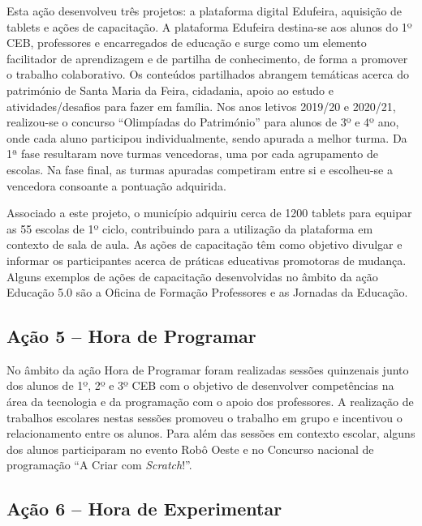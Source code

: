 \documentclass[
]{book}
\begin{document}
Esta ação desenvolveu três projetos: a plataforma digital Edufeira, aquisição de tablets e ações de capacitação. A plataforma Edufeira destina-se aos alunos do 1º CEB, professores e encarregados de educação e surge como um elemento facilitador de aprendizagem e de partilha de conhecimento, de forma a promover o trabalho colaborativo. Os conteúdos partilhados abrangem temáticas acerca do património de Santa Maria da Feira, cidadania, apoio ao estudo e atividades/desafios para fazer em família. Nos anos letivos 2019/20 e 2020/21, realizou-se o concurso ``Olimpíadas do Património'' para alunos de 3º e 4º ano, onde cada aluno participou individualmente, sendo apurada a melhor turma. Da 1ª fase resultaram nove turmas vencedoras, uma por cada agrupamento de escolas. Na fase final, as turmas apuradas competiram entre si e escolheu-se a vencedora consoante a pontuação adquirida.

Associado a este projeto, o município adquiriu cerca de 1200 tablets para equipar as 55 escolas de 1º ciclo, contribuindo para a utilização da plataforma em contexto de sala de aula. As ações de capacitação têm como objetivo divulgar e informar os participantes acerca de práticas educativas promotoras de mudança. Alguns exemplos de ações de capacitação desenvolvidas no âmbito da ação Educação 5.0 são a Oficina de Formação Professores e as Jornadas da Educação.

\hypertarget{auxe7uxe3o-5-hora-de-programar}{%
\subsection{\texorpdfstring{\textbf{Ação 5 -- Hora de Programar}}{Ação 5 -- Hora de Programar}}\label{auxe7uxe3o-5-hora-de-programar}}

No âmbito da ação Hora de Programar foram realizadas sessões quinzenais junto dos alunos de 1º, 2º e 3º CEB com o objetivo de desenvolver competências na área da tecnologia e da programação com o apoio dos professores. A realização de trabalhos escolares nestas sessões promoveu o trabalho em grupo e incentivou o relacionamento entre os alunos. Para além das sessões em contexto escolar, alguns dos alunos participaram no evento Robô Oeste e no Concurso nacional de programação ``A Criar com \emph{Scratch}!''.

\hypertarget{auxe7uxe3o-6-hora-de-experimentar}{%
\subsection{\texorpdfstring{\textbf{Ação 6 -- Hora de Experimentar }}{Ação 6 -- Hora de Experimentar }}\label{auxe7uxe3o-6-hora-de-experimentar}}
\end{document}
